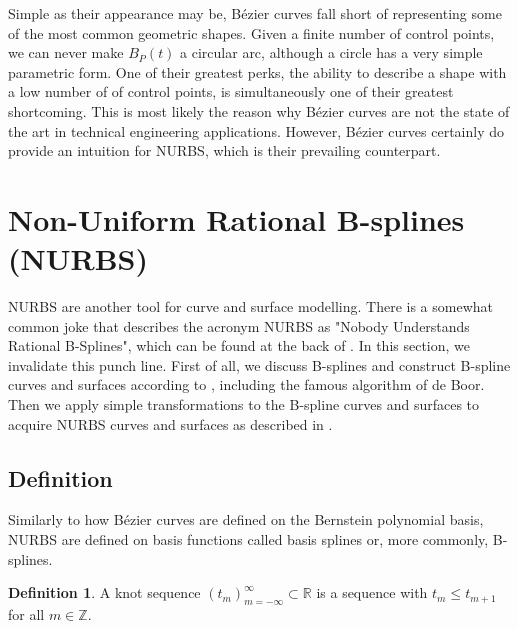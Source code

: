 \documentclass[a4paper, 11pt]{report}
\theoremstyle{definition}
\newtheorem{definition}{Definition}[section]
\begin{document}
	Simple as their appearance may be, Bézier curves fall short of representing some of the most common geometric shapes. Given a finite number of control points, we can never make $B_P(t)$ a circular arc, although a circle has a very simple parametric form. One of their greatest perks, the ability to describe a shape with a low number of of control points, is simultaneously one of their greatest shortcoming. This is most likely the reason why Bézier curves are not the state of the art in technical engineering applications. However, Bézier curves certainly do provide an intuition for NURBS, which is their prevailing counterpart.

\section{Non-Uniform Rational B-splines (NURBS)}
	NURBS are another tool for curve and surface modelling. There is a somewhat common joke that describes the acronym NURBS as "Nobody Understands Rational B-Splines", which can be found at the back of \cite{Piegl1997}. In this section, we invalidate this punch line. First of all, we discuss B-splines and construct B-spline curves and surfaces according to \cite{Farin2001}, including the famous algorithm of de Boor. Then we apply simple transformations to the B-spline curves and surfaces to acquire NURBS curves and surfaces as described in \cite{Piegl1997}.

\subsection{Definition}
	Similarly to how Bézier curves are defined on the Bernstein polynomial basis, NURBS are defined on basis functions called basis splines or, more commonly, B-splines.

	\begin{definition}
		A knot sequence $(t_m)_{m=-\infty}^{\infty} \subset \mathbb{R}$ is a sequence with $t_{m} \leq t_{m+1}$ for all $m \in \mathbb{Z}$.
	\end{definition}
\end{document}
